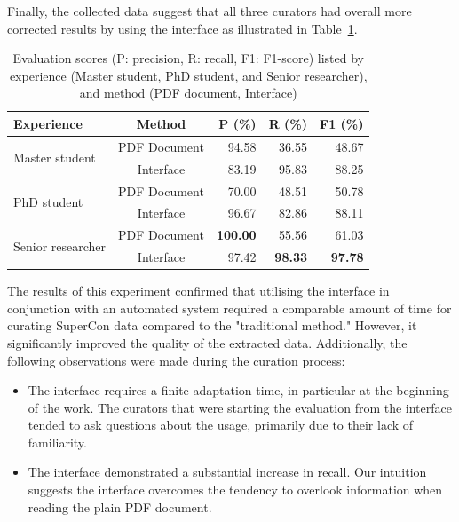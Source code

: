 \documentclass[a4paper]{article}
\begin{document}
Finally, the collected data suggest that all three curators had overall more corrected results by using the interface as illustrated in Table~\ref{tab:accuracy-by-experience-method}. 

\begin{table}[h]
\centering\small
\caption{Evaluation scores (P: precision, R: recall, F1: F1-score) listed by experience (Master student, PhD student, and Senior researcher), and method (PDF document, Interface)}
\begin{tabular}{lcrrr}
\toprule
\textbf{Experience} & \textbf{Method} & \textbf{P (\%)} & \textbf{R (\%)} & 
\textbf{F1 (\%)} \\
\midrule
\multirow{2}{*}{Master student} & PDF Document & 94.58 & 36.55 & 48.67 \\
 & Interface & 83.19 & 95.83 & 88.25 \\
\midrule
\multirow{2}{*}{PhD student} & PDF Document & 70.00 & 48.51 & 50.78 \\
 & Interface & 96.67 & 82.86 & 88.11 \\
\midrule
\multirow{2}{*}{Senior researcher} & PDF Document & \textbf{100.00} & 55.56 & 61.03 \\
 & Interface & 97.42 & \textbf{98.33} & \textbf{97.78} \\
\bottomrule
\end{tabular}
\label{tab:accuracy-by-experience-method}
\end{table}


The results of this experiment confirmed that utilising the interface in conjunction with an automated system required a comparable amount of time for curating SuperCon data compared to the "traditional method." However, it significantly improved the quality of the extracted data.
Additionally, the following observations were made during the curation process:

\begin{itemize}
    \item The interface requires a finite adaptation time, in particular at the beginning of the work. The curators that were starting the evaluation from the interface tended to ask questions about the usage, primarily due to their lack of familiarity. 
    \item The interface demonstrated a substantial increase in recall. Our intuition suggests the interface overcomes the tendency to overlook information when reading the plain PDF document.
\end{itemize}
\end{document}
